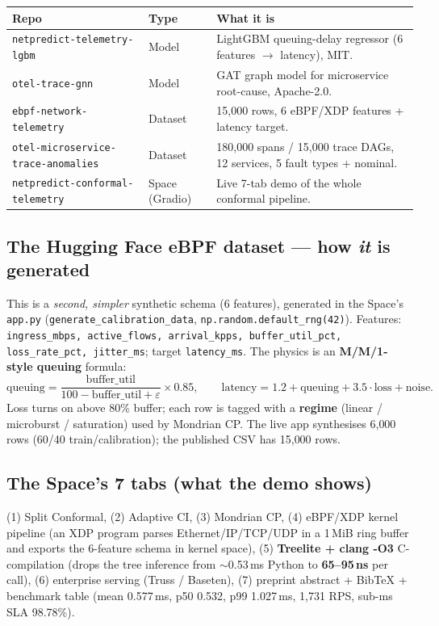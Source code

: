 \documentclass[11pt,a4paper]{article}
\newcommand{\pf}[1]{\nolinkurl{#1}}
\begin{document}
\begin{center}
\begin{tabularx}{\linewidth}{@{}p{4.9cm}p{2.1cm}X@{}}
\toprule
\textbf{Repo} & \textbf{Type} & \textbf{What it is} \\
\midrule
\pf{netpredict-telemetry-lgbm} & Model & LightGBM queuing-delay regressor (6 features $\rightarrow$ latency), MIT. \\
\pf{otel-trace-gnn} & Model & GAT graph model for microservice root-cause, Apache-2.0. \\
\pf{ebpf-network-telemetry} & Dataset & 15{,}000 rows, 6 eBPF/XDP features + latency target. \\
\pf{otel-microservice-trace-anomalies} & Dataset & 180{,}000 spans / 15{,}000 trace DAGs, 12 services, 5 fault types + nominal. \\
\pf{netpredict-conformal-telemetry} & Space (Gradio) & Live 7-tab demo of the whole conformal pipeline. \\
\bottomrule
\end{tabularx}
\end{center}

\subsection{The Hugging Face eBPF dataset --- how \emph{it} is generated}
This is a \emph{second, simpler} synthetic schema (6 features), generated in the Space's \texttt{app.py}
(\texttt{generate\_calibration\_data}, \texttt{np.random.default\_rng(42)}). Features:
\texttt{ingress\_mbps, active\_flows, arrival\_kpps, buffer\_util\_pct, loss\_rate\_pct, jitter\_ms};
target \texttt{latency\_ms}. The physics is an \textbf{M/M/1-style queuing} formula:
\[ \text{queuing}=\frac{\text{buffer\_util}}{100-\text{buffer\_util}+\varepsilon}\times0.85,\qquad
   \text{latency}=1.2+\text{queuing}+3.5\cdot\text{loss}+\text{noise}. \]
Loss turns on above 80\% buffer; each row is tagged with a \textbf{regime}
(linear / microburst / saturation) used by Mondrian CP. The live app synthesises 6{,}000 rows (60/40
train/calibration); the published CSV has 15{,}000 rows.

\subsection{The Space's 7 tabs (what the demo shows)}
(1) Split Conformal, (2) Adaptive CI, (3) Mondrian CP, (4) eBPF/XDP kernel pipeline (an XDP program parses
Ethernet/IP/TCP/UDP in a 1\,MiB ring buffer and exports the 6-feature schema in kernel space),
(5) \textbf{Treelite + clang -O3} C-compilation (drops the tree inference from $\sim$0.53\,ms Python to
\textbf{65--95\,ns} per call), (6) enterprise serving (Truss / Baseten), (7) preprint abstract + BibTeX +
benchmark table (mean 0.577\,ms, p50 0.532, p99 1.027\,ms, 1{,}731 RPS, sub-ms SLA 98.78\%).
\end{document}
